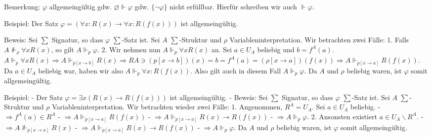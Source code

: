 \documentclass[a4paper]{article}
\begin{document}
\begin{multicols}{3}
  Bemerkung: $\varphi$ allgemeingültig gdw. $\varnothing\Vdash\varphi$
  gdw. $\{\lnot\varphi\}$ nicht erfüllbar. Hierfür schreiben wir auch
  $\Vdash\varphi$.

  Beispiel: Der Satz
  $\varphi=(\forall x:R(x)\rightarrow\forall x:R(f(x)))$ ist
  allgemeingültig.

  Beweis: Sei $\sum$ Signatur, so dass $\varphi$ $\sum$-Satz ist. Sei $A$
  $\sum$-Struktur und $\rho$ Variableninterpretation. Wir betrachten zwei
  Fälle: 1. Falls $A\not\Vdash_\rho\forall x R(x)$, so gilt
  $A\Vdash_p\varphi$. 2. Wir nehmen nun $A\Vdash_p\forall x R(x)$ an. Sei
  $a\in U_A$ beliebig und $b=f^A(a)$.
  $A\Vdash_p\forall x R(x) \Rightarrow A\Vdash_{p[x\rightarrow b]} R(x) \Rightarrow RA\owns (p[x\rightarrow b])(x) = b = f^A(a) = (\rho[x\rightarrow a])(f(x)) \Rightarrow A\Vdash_{p[x\rightarrow a]}R(f(x))$.
  Da $a\in U_A$ beliebig war, haben wir also $A\Vdash_p\forall x:R(f(x))$.
  Also gilt auch in diesem Fall $A\Vdash_p\varphi$. Da $A$ und $\rho$
  beliebig waren, ist $\varphi$ somit allgemeingültig.

  Beispiel: - Der Satz $\varphi =\exists x(R(x)\rightarrow R(f(x)))$ ist
  allgemeingültig. - Beweis: Sei $\sum$ Signatur, so dass $\varphi$
  $\sum$-Satz ist. Sei $A$ $\sum$-Struktur und $\rho$
  Variableninterpretation. Wir betrachten wieder zwei Fälle: 1.
  Angenommen, $R^A=U_A$. Sei $a\in U_A$ beliebig. -
  $\Rightarrow f^A(a)\in R^A$ -
  $\Rightarrow A\Vdash_{p[x\rightarrow a]} R(f(x))$ -
  $\Rightarrow A\Vdash_{p[x\rightarrow a]} R(x)\rightarrow R(f(x))$ -
  $\Rightarrow A\Vdash_p\varphi$. 2. Ansonsten existiert
  $a\in U_A\backslash R^A$. -
  $\Rightarrow A\not\Vdash_{p[x\rightarrow a]} R(x)$ -
  $\Rightarrow A\Vdash_{p[x\rightarrow a]} R(x)\rightarrow R(f(x))$ -
  $\Rightarrow A\Vdash_p \varphi$. Da $A$ und $\rho$ beliebig waren, ist
  $\varphi$ somit allgemeingültig.


\end{multicols}
\end{document}
